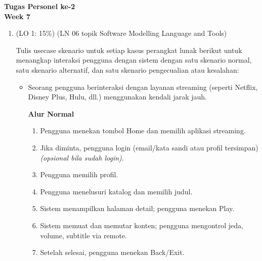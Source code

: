 \documentclass[a4paper]{article}
\begin{document}
\pagestyle{empty}

\begin{center}
    {\LARGE \textbf{Tugas Personel ke-2}}\\[0.5em]
    {\Large \textbf{Week 7}}
\end{center}

\begin{enumerate}[itemsep=1em]
  \item (LO 1: 15\%) (LN 06 topik Software Modelling Language and Tools)
  
  Tulis usecase skenario untuk setiap kasus perangkat lunak berikut untuk menangkap interaksi pengguna dengan sistem dengan satu skenario normal, satu skenario alternatif, dan satu skenario pengecualian atau kesalahan:

  \begin{itemize}[itemsep=1em]
    \item Seorang pengguna berinteraksi dengan layanan streaming (seperti Netflix, Disney Plus, Hulu, dll.) menggunakan kendali jarak jauh.

    \vspace{1em}


    \vspace{1em}

    \textbf{Alur Normal}
    \begin{enumerate}[nosep]
      \item Pengguna menekan tombol Home dan memilih aplikasi streaming.
      \item Jika diminta, pengguna login (email/kata sandi atau profil tersimpan) \textit{(opsional bila sudah login)}.
      \item Pengguna memilih profil.
      \item Pengguna menelusuri katalog dan memilih judul.
      \item Sistem menampilkan halaman detail; pengguna menekan Play.
      \item Sistem memuat dan memutar konten; pengguna mengontrol jeda, volume, subtitle via remote.
      \item Setelah selesai, pengguna menekan Back/Exit.
    \end{enumerate}


\end{itemize}
\end{enumerate}
\end{document}
